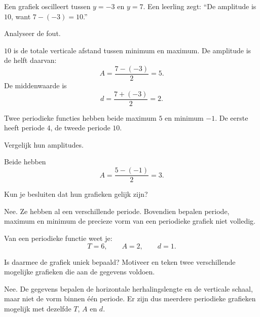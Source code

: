 \documentclass{ximera}
\begin{document}
\begin{oefening}[Foutenanalyse]{\oefU\ESS}

Een grafiek oscilleert tussen \(y=-3\) en \(y=7\).
Een leerling zegt:
``De amplitude is \(10\), want \(7-(-3)=10\).''

Analyseer de fout.

\begin{oplossing}
\(10\) is de totale verticale afstand tussen minimum en maximum.
De amplitude is de helft daarvan:
\[
A=\frac{7-(-3)}2=5.
\]
De middenwaarde is
\[
d=\frac{7+(-3)}2=2.
\]
\end{oplossing}
\end{oefening}

\begin{oefening}{\oefU\ESS}

Twee periodieke functies hebben beide maximum \(5\) en minimum \(-1\).
De eerste heeft periode \(4\), de tweede periode \(10\).

\begin{question}
Vergelijk hun amplitudes.
\begin{oplossing}
Beide hebben
\[
A=\frac{5-(-1)}2=3.
\]
\end{oplossing}
\end{question}

\begin{question}
Kun je besluiten dat hun grafieken gelijk zijn?
\begin{oplossing}
Nee. Ze hebben al een verschillende periode. Bovendien bepalen periode,
maximum en minimum de precieze vorm van een periodieke grafiek niet volledig.
\end{oplossing}
\end{question}
\end{oefening}



\begin{oefening}{\oefG}

Van een periodieke functie weet je:
\[
T=6,\qquad A=2,\qquad d=1.
\]

Is daarmee de grafiek uniek bepaald? Motiveer en teken twee verschillende
mogelijke grafieken die aan de gegevens voldoen.

\begin{oplossing}
Nee. De gegevens bepalen de horizontale herhalingslengte en de verticale schaal,
maar niet de vorm binnen één periode. Er zijn dus meerdere periodieke grafieken
mogelijk met dezelfde \(T\), \(A\) en \(d\).
\end{oplossing}
\end{oefening}
\end{document}
